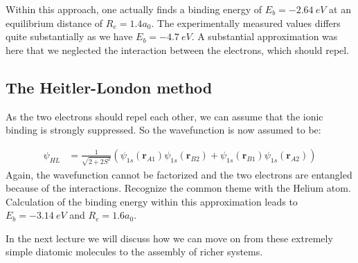 \documentclass[10pt]{article}
\let\cite\citep
\providecommand\citep{\cite}
\begin{document}
Within this approach, one actually finds a binding energy of $E_b = \SI{-2.64}{eV}$ at an equilibrium distance of $R_e = 1.4 a_0$. The experimentally measured values differs quite substantially as we have $E_b = \SI{-4.7}{eV}$. A substantial approximation was here that we neglected the interaction between the electrons, which should repel.



\subsection{The Heitler-London method}

As the two electrons should repel each other, we can assume that the ionic binding is strongly suppressed. So the wavefunction is now assumed to be:

\begin{eqnarray}
\psi_{HL} &= \frac{1}{\sqrt{2 + 2S^2}}\left(\psi_{1s}(\mathbf{r}_{A1})\psi_{1s}(\mathbf{r}_{B2})+\psi_{1s}(\mathbf{r}_{B1})\psi_{1s}(\mathbf{r}_{A2})\right)
\end{eqnarray}
Again, the wavefunction cannot be factorized and the two electrons are entangled because of the interactions. Recognize the common theme with the Helium atom. Calculation of the binding energy within this approximation leads to $E_b = \SI{-3.14}{eV}$ and $R_e=1.6a_0$.

In the next lecture \cite{moleculesa} we will discuss how we can move on from these extremely simple diatomic molecules to the assembly of richer systems.

\FloatBarrier


\end{document}
